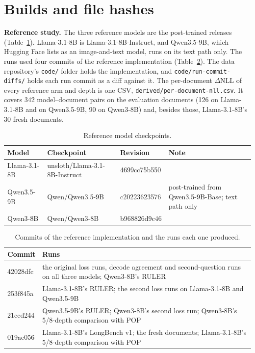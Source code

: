 \documentclass[11pt]{article}
\begin{document}
\section{Builds and file hashes}\label{app:F}
\textbf{Reference study.} The three reference models are the post-trained releases (Table~\ref{tab:F.1}). Llama-3.1-8B is Llama-3.1-8B-Instruct, and Qwen3.5-9B, which Hugging Face lists as an image-and-text model, runs on its text path only. The runs used four commits of the reference implementation (Table~\ref{tab:F.2}). The data repository's \texttt{code/\allowbreak{}} folder holds the implementation, and \texttt{code/\allowbreak{}run-\allowbreak{}commit-\allowbreak{}diffs/\allowbreak{}} holds each run commit as a diff against it. The per-document $\Delta$NLL of every reference arm and depth is one CSV, \texttt{derived/\allowbreak{}per-\allowbreak{}document-\allowbreak{}nll.\allowbreak{}csv}. It covers 342 model--document pairs on the evaluation documents (126 on Llama-3.1-8B and on Qwen3.5-9B, 90 on Qwen3-8B) and, besides those, Llama-3.1-8B's 30 fresh documents.

\begin{table}[H]
\centering
\caption{Reference model checkpoints.}\label{tab:F.1}
\small
\setlength{\tabcolsep}{4pt}
\begin{tabularx}{\linewidth}{lll>{\raggedright\arraybackslash\hsize=1.000\hsize}X}
\toprule
Model & Checkpoint & Revision & Note \\
\midrule
Llama-3.1-8B & unsloth/\allowbreak{}Llama-3.1-8B-Instruct & 4699cc75b550 &  \\
Qwen3.5-9B & Qwen/\allowbreak{}Qwen3.5-9B & c20223623576 & post-trained from Qwen3.5-9B-Base; text path only \\
Qwen3-8B & Qwen/\allowbreak{}Qwen3-8B & b968826d9c46 &  \\
\bottomrule
\end{tabularx}
\end{table}

\begin{table}[H]
\centering
\caption{Commits of the reference implementation and the runs each one produced.}\label{tab:F.2}
\small
\setlength{\tabcolsep}{4pt}
\begin{tabularx}{\linewidth}{l>{\raggedright\arraybackslash\hsize=1.000\hsize}X}
\toprule
Commit & Runs \\
\midrule
42028dfc & the original loss runs, decode agreement and second-question runs on all three models; Qwen3-8B's RULER \\
253f845a & Llama-3.1-8B's RULER; the second loss runs on Llama-3.1-8B and Qwen3.5-9B \\
21ccd244 & Qwen3.5-9B's RULER; Qwen3-8B's second loss run; Qwen3-8B's 5/\allowbreak{}8-depth comparison with POP \\
019ae056 & Llama-3.1-8B's LongBench v1; the fresh documents; Llama-3.1-8B's 5/\allowbreak{}8-depth comparison with POP \\
\bottomrule
\end{tabularx}
\end{table}
\end{document}
